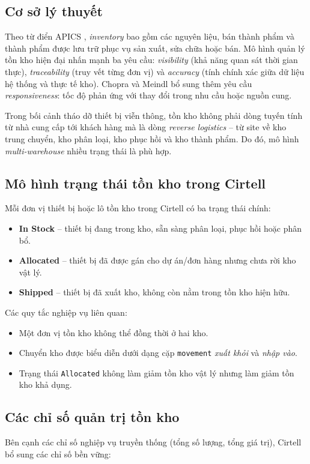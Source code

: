 \subsection{Cơ sở lý thuyết}
Theo từ điển APICS \cite{apics2018}, \emph{inventory} bao gồm các nguyên liệu, bán thành phẩm và thành phẩm được lưu trữ phục vụ sản xuất, sửa chữa hoặc bán. Mô hình quản lý tồn kho hiện đại nhấn mạnh ba yêu cầu: \emph{visibility} (khả năng quan sát thời gian thực), \emph{traceability} (truy vết từng đơn vị) và \emph{accuracy} (tính chính xác giữa dữ liệu hệ thống và thực tế kho). Chopra và Meindl \cite{chopra2019scm} bổ sung thêm yêu cầu \emph{responsiveness}: tốc độ phản ứng với thay đổi trong nhu cầu hoặc nguồn cung.

Trong bối cảnh tháo dỡ thiết bị viễn thông, tồn kho không phải dòng tuyến tính từ nhà cung cấp tới khách hàng mà là dòng \emph{reverse logistics} -- từ site về kho trung chuyển, kho phân loại, kho phục hồi và kho thành phẩm. Do đó, mô hình \emph{multi-warehouse} nhiều trạng thái là phù hợp.

\subsection{Mô hình trạng thái tồn kho trong Cirtell}
Mỗi đơn vị thiết bị hoặc lô tồn kho trong Cirtell có ba trạng thái chính:

\begin{itemize}[leftmargin=1.2cm]
    \item \textbf{In Stock} -- thiết bị đang trong kho, sẵn sàng phân loại, phục hồi hoặc phân bổ.
    \item \textbf{Allocated} -- thiết bị đã được gán cho dự án/đơn hàng nhưng chưa rời kho vật lý.
    \item \textbf{Shipped} -- thiết bị đã xuất kho, không còn nằm trong tồn kho hiện hữu.
\end{itemize}

Các quy tắc nghiệp vụ liên quan:
\begin{itemize}[leftmargin=1.2cm]
    \item Một đơn vị tồn kho không thể đồng thời ở hai kho.
    \item Chuyển kho được biểu diễn dưới dạng cặp \texttt{movement} \emph{xuất khỏi} và \emph{nhập vào}.
    \item Trạng thái \texttt{Allocated} không làm giảm tồn kho vật lý nhưng làm giảm tồn kho khả dụng.
\end{itemize}

\subsection{Các chỉ số quản trị tồn kho}
Bên cạnh các chỉ số nghiệp vụ truyền thống (tổng số lượng, tổng giá trị), Cirtell bổ sung các chỉ số bền vững:

